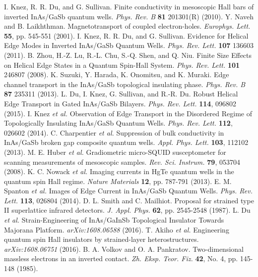 \documentclass[titlepage,a4paper]{book}
\begin{document}
\begin{thebibliography}{199}
I. Knez, R. R. Du, and G. Sullivan. Finite conductivity in mesoscopic Hall bars of inverted InAs/GaSb quantum wells. \textit{Phys. Rev. B} \textbf{81} 201301(R) (2010).
Y. Naveh and B. Laikhthman. Magnetotransport of coupled electron-holes. \textit{Europhys. Lett.} \textbf{55}, pp. 545-551 (2001).
I. Knez, R. R. Du, and G. Sullivan. Evidence for Helical Edge Modes in Inverted InAs/GaSb Quantum Wells. \textit{Phys. Rev. Lett.} \textbf{107} 136603 (2011).
B. Zhou, H.-Z. Lu, R.-L. Chu, S.-Q. Shen, and Q. Niu. Finite Size Effects on Helical Edge States in a Quantum Spin-Hall System. \textit{Phys. Rev. Lett.} \textbf{101} 246807 (2008).
K. Suzuki, Y. Harada, K. Onomitsu, and K. Muraki. Edge channel transport in the InAs/GaSb topological insulating phase. \textit{Phys. Rev. B} \textbf{87} 235311 (2013).
L. Du, I. Knez, G. Sullivan, and R.-R. Du. Robust Helical Edge Transport in Gated InAs/GaSb Bilayers. \textit{Phys. Rev. Lett.} \textbf{114}, 096802 (2015).
I. Knez \textit{et al.} Observation of Edge Transport in the Disordered Regime of Topologically Insulating InAs/GaSb Quantum Wells. \textit{Phys. Rev. Lett.} \textbf{112}, 026602 (2014).
C. Charpentier \textit{et al.} Suppression of bulk conductivity in InAs/GaSb broken gap composite quantum wells. \textit{Appl. Phys. Lett.} \textbf{103}, 112102 (2013).
M. E. Huber \textit{et al.} Gradiometric micro-SQUID susceptometer for scanning measurements of mesoscopic samples. \textit{Rev. Sci. Instrum.} \textbf{79}, 053704 (2008).
K. C. Nowack \textit{et al.} Imaging currents in HgTe quantum wells in the quantum spin Hall regime. \textit{Nature Materials} \textbf{12}, pp. 787-791 (2013).
E. M. Spanton \textit{et al.} Images of Edge Current in InAs/GaSb Quantum Wells. \textit{Phys. Rev. Lett.} \textbf{113}, 026804 (2014).
D. L. Smith and C. Mailhiot. Proposal for strained type II superlattice infrared detectors. \textit{J. Appl. Phys.} \textbf{62}, pp. 2545-2548 (1987). 
L. Du \textit{et al.} Strain-Engineering of InAs/GaInSb Topological Insulator Towards Majorana Platform. \textit{arXiv:1608.06588} (2016).
T. Akiho \textit{et al.} Engineering quantum spin Hall insulators by strained-layer heterostructures. \textit{arXiv:1608.06751} (2016).
B. A. Volkov and O. A. Pankratov. Two-dimensional massless electrons in an inverted contact. \textit{Zh. Eksp. Teor. Fiz.} \textbf{42}, No. 4, pp. 145-148 (1985).

\end{thebibliography}
\end{document}
